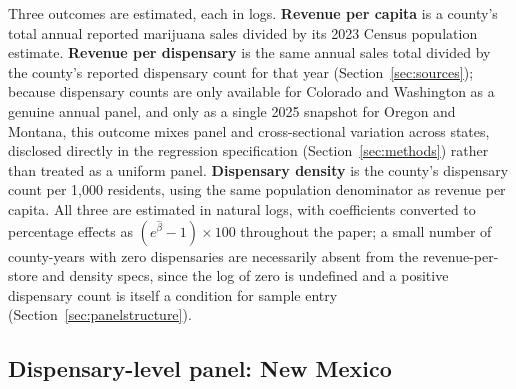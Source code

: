 \documentclass[12pt]{article}
\begin{document}
Three outcomes are estimated, each in logs. \textbf{Revenue per capita} is a county's total annual reported
marijuana sales divided by its 2023 Census population estimate. \textbf{Revenue per dispensary} is the same
annual sales total divided by the county's reported dispensary count for that year (Section~\ref{sec:sources});
because dispensary counts are only available for Colorado and Washington as a genuine annual panel, and only
as a single 2025 snapshot for Oregon and Montana, this outcome mixes panel and cross-sectional variation across
states, disclosed directly in the regression specification (Section~\ref{sec:methods}) rather than treated as a
uniform panel. \textbf{Dispensary density} is the county's dispensary count per 1,000 residents, using the same
population denominator as revenue per capita. All three are estimated in natural logs, with coefficients
converted to percentage effects as $(e^{\hat\beta}-1)\times 100$ throughout the paper; a small number of
county-years with zero dispensaries are necessarily absent from the revenue-per-store and density specs, since
the log of zero is undefined and a positive dispensary count is itself a condition for sample entry
(Section~\ref{sec:panelstructure}).

\subsection{Dispensary-level panel: New Mexico}
\label{sec:nmdispensary}
\end{document}
